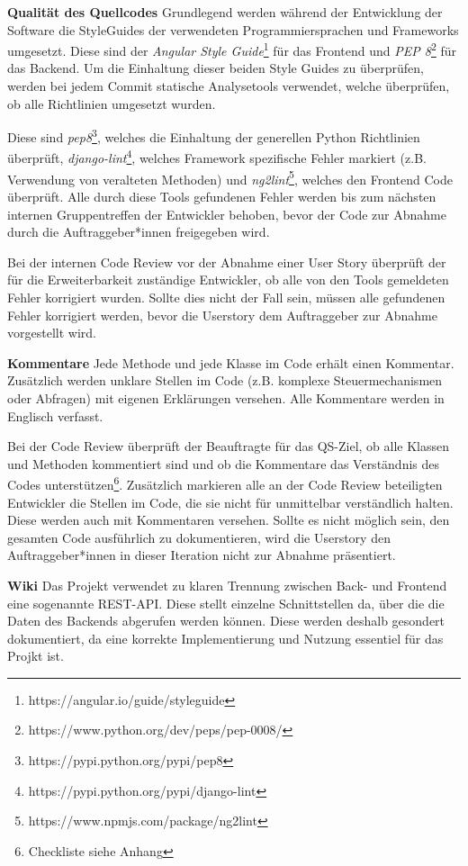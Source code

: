 \documentclass[accentcolor=tud0b,12pt,paper=a4]{tudreport}
\begin{document}
\textbf{Qualität des Quellcodes}
Grundlegend werden während der Entwicklung der Software die StyleGuides der verwendeten Programmiersprachen und Frameworks umgesetzt. Diese sind der \emph{Angular Style Guide}\footnote{https://angular.io/guide/styleguide} für das Frontend und \emph{PEP 8}\footnote{https://www.python.org/dev/peps/pep-0008/} für das Backend. Um die Einhaltung dieser beiden Style Guides zu überprüfen, werden bei jedem Commit statische Analysetools verwendet, welche überprüfen, ob alle Richtlinien umgesetzt wurden.

Diese sind \emph{pep8}\footnote{https://pypi.python.org/pypi/pep8}, welches die Einhaltung der generellen Python Richtlinien überprüft, \emph{django-lint}\footnote{https://pypi.python.org/pypi/django-lint}, welches Framework spezifische Fehler markiert (z.B. Verwendung von veralteten Methoden) und \emph{ng2lint}\footnote{https://www.npmjs.com/package/ng2lint}, welches den Frontend Code überprüft. Alle durch diese Tools gefundenen Fehler werden bis zum nächsten internen Gruppentreffen der Entwickler behoben, bevor der Code zur Abnahme durch die Auftraggeber*innen freigegeben wird.

Bei der internen Code Review vor der Abnahme einer User Story überprüft der für die Erweiterbarkeit zuständige Entwickler, ob alle von den Tools gemeldeten Fehler korrigiert wurden. Sollte dies nicht der Fall sein, müssen alle gefundenen Fehler korrigiert werden, bevor die Userstory dem Auftraggeber zur Abnahme vorgestellt wird.


\textbf{Kommentare}
Jede Methode und jede Klasse im Code erhält einen Kommentar. Zusätzlich werden unklare Stellen im Code (z.B. komplexe Steuermechanismen oder Abfragen) mit eigenen Erklärungen versehen. Alle Kommentare werden in Englisch verfasst.

Bei der Code Review überprüft der Beauftragte für das QS-Ziel, ob alle Klassen und Methoden kommentiert sind und ob die Kommentare das Verständnis des Codes unterstützen\footnote{Checkliste siehe Anhang}. Zusätzlich markieren alle an der Code Review beteiligten Entwickler die Stellen im Code, die sie nicht für unmittelbar verständlich halten. Diese werden auch mit Kommentaren versehen. Sollte es nicht möglich sein, den gesamten Code ausführlich zu dokumentieren, wird die Userstory den Auftraggeber*innen in dieser Iteration nicht zur Abnahme präsentiert.


\textbf{Wiki}
Das Projekt verwendet zu klaren Trennung zwischen Back- und Frontend eine sogenannte REST-API. Diese stellt einzelne Schnittstellen da, über die die Daten des Backends abgerufen werden können. Diese werden deshalb gesondert dokumentiert, da eine korrekte Implementierung und Nutzung essentiel für das Projkt ist. 
\end{document}
